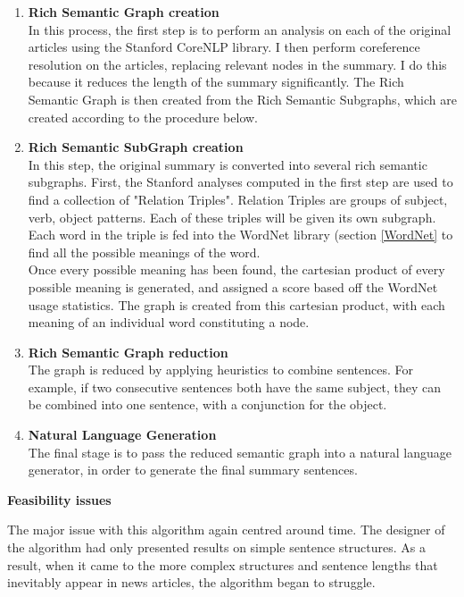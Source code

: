\documentclass[12pt]{article}
\begin{document}
\begin{enumerate}
	\item \textbf{Rich Semantic Graph creation} \\ 
	In this process, the first step is to perform an analysis on each of the original articles using the Stanford CoreNLP library. I then perform coreference resolution on the articles, replacing relevant nodes in the summary. I do this because it reduces the length of the summary significantly. The Rich Semantic Graph is then created from the Rich Semantic Subgraphs, which are created according to the procedure below. \\
	\item \textbf{Rich Semantic SubGraph creation} \\
	In this step, the original summary is converted into several rich semantic subgraphs. First, the Stanford analyses computed in the first step are used to find a collection of "Relation Triples". Relation Triples are groups of subject, verb, object patterns. Each of these triples will be given its own subgraph. Each word in the triple is fed into the WordNet library (section \ref{WordNet} to find all the possible meanings of the word. \\
	Once every possible meaning has been found, the cartesian product of every possible meaning is generated, and assigned a score based off the WordNet usage statistics. The graph is created from this cartesian product, with each meaning of an individual word constituting a node. \\
	\item \textbf{Rich Semantic Graph reduction} \\
	The graph is reduced by applying heuristics to combine sentences. For example, if two consecutive sentences both have the same subject, they can be combined into one sentence, with a conjunction for the object. \\
	\item \textbf{Natural Language Generation}\\
	The final stage is to pass the reduced semantic graph into a natural language generator, in order to generate the final summary sentences.\\
\end{enumerate}

\textbf{Feasibility issues}

The major issue with this algorithm again centred around time. The designer of the algorithm had only presented results on simple sentence structures. As a result, when it came to the more complex structures and sentence lengths that inevitably appear in news articles, the algorithm began to struggle.
\end{document}
